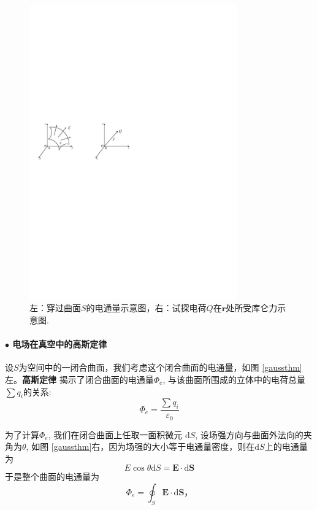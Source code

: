 \documentclass[10pt,reqno, final]{ctexart}
\begin{document}
\begin{figure}[htp]
	\centering
	\includegraphics[width=0.8\textwidth]{Figures/EandCoulumb}
	\caption {左：穿过曲面$S$的电通量示意图，右：试探电荷$Q$在$\bm{r}$处所受库仑力示意图. }
	\label{eandcoulumb}
\end{figure}

\paragraph{$\bullet$ 电场在真空中的高斯定律}
设$S$为空间中的一闭合曲面，我们考虑这个闭合曲面的电通量，如图 \ref{gaussthm}左。\textbf{高斯定律} 揭示了闭合曲面的电通量$\Phi_e$, 与该曲面所围成的立体中的电荷总量$\sum q_i$的关系: 
\begin{equation}\label{gaussthm}
\displaystyle \Phi_e = \frac{\sum q_i}{\varepsilon_0} 
\end{equation}

为了计算$\Phi_e$, 我们在闭合曲面上任取一面积微元 $\mathrm{d}S$, 设场强方向与曲面外法向的夹角为$\theta$, 如图 \ref{gaussthm}右，因为场强的大小等于电通量密度，则在$\mathrm{d}S$上的电通量为 
$$E \cos \theta \mathrm{d}S =  \bm{E}\cdot \mathrm{d}\bm{S}$$
于是整个曲面的电通量为
\begin{equation}\label{tongliang}
\Phi_e = \oint_{S}\bm{E}\cdot \mathrm{d}\bm{S}，
\end{equation}
\end{document}
